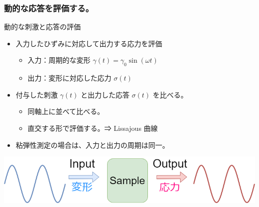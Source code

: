 \documentclass[unicode,12pt]{beamer}%
\begin{document}
\begin{frame}
	\frametitle{動的な応答を評価する。}
		\begin{block}{動的な刺激と応答の評価}
			\begin{itemize}
				\item 入力したひずみに対応して出力する応力を評価
				\begin{itemize}
					\item 入力：周期的な変形 $\gamma(t) = \gamma_0 \sin(\omega t)$
					\item 出力：変形に対応した応力 $\sigma(t)$
				\end{itemize}
				\item 付与した刺激 $\gamma (t)$ と出力した応答 $\sigma (t)$ を比べる。
				\begin{itemize}
					\item 同軸上に並べて比べる。
					\item 直交する形で評価する。⇒ Lissajous 曲線
				\end{itemize}
				\item 粘弾性測定の場合は、入力と出力の周期は同一。
			\end{itemize}
		\end{block}
		\vspace{3mm}
		\centering
			\includegraphics[width=\textwidth]{dynamic_IO.png}
\end{frame}
\end{document}
